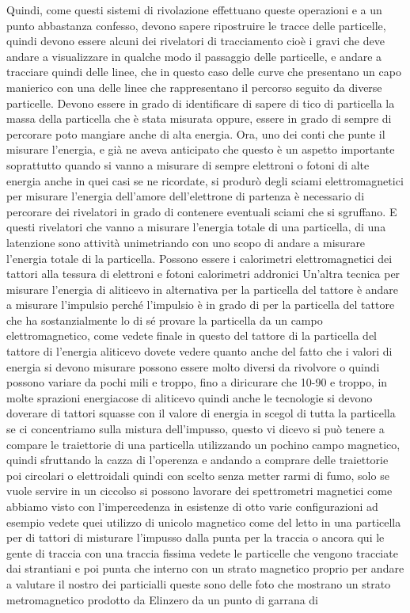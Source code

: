 {Quindi, come questi sistemi di rivolazione effettuano queste operazioni e a un punto abbastanza confesso, devono sapere ripostruire le tracce delle particelle, quindi devono essere alcuni dei rivelatori di tracciamento cioè i gravi che deve andare a visualizzare in qualche modo il passaggio delle particelle, e andare a tracciare quindi delle linee, che in questo caso delle curve che presentano un capo manierico con una delle linee che rappresentano il percorso seguito da diverse particelle. Devono essere in grado di identificare di sapere di tico di particella la massa della particella che è stata misurata oppure, essere in grado di sempre di percorare poto mangiare anche di alta energia. Ora, uno dei conti che punte il misurare l'energia, e già ne aveva anticipato che questo è un aspetto importante soprattutto quando si vanno a misurare di sempre elettroni o fotoni di alte energia anche in quei casi se ne ricordate, si produrò degli sciami elettromagnetici per misurare l'energia dell'amore dell'elettrone di partenza è necessario di percorare dei rivelatori in grado di contenere eventuali sciami che si sgruffano. E questi rivelatori che vanno a misurare l'energia totale di una particella, di una latenzione sono attività unimetriando con uno scopo di andare a misurare l'energia totale di la particella. Possono essere i calorimetri elettromagnetici dei tattori alla tessura di elettroni e fotoni calorimetri addronici Un'altra tecnica per misurare l'energia di aliticevo in alternativa per la particella del tattore è andare a misurare l'impulsio perché l'impulsio è in grado di per la particella del tattore che ha sostanzialmente lo di sé provare la particella da un campo elettromagnetico, come vedete finale in questo del tattore di la particella del tattore di l'energia aliticevo dovete vedere quanto anche del fatto che i valori di energia si devono misurare possono essere molto diversi da rivolvore o quindi possono variare da pochi mili e troppo, fino a diricurare che 10-90 e troppo, in molte sprazioni energiacose di aliticevo quindi anche le tecnologie si devono doverare di tattori squasse con il valore di energia in scegol di tutta la particella se ci concentriamo sulla mistura dell'impusso, questo vi dicevo si può tenere a compare le traiettorie di una particella utilizzando un pochino campo magnetico, quindi sfruttando la cazza di l'operenza e andando a comprare delle traiettorie poi circolari o elettroidali quindi con scelto senza metter rarmi di fumo, solo se vuole servire in un ciccolso si possono lavorare dei spettrometri magnetici come abbiamo visto con l'impercedenza in esistenze di otto varie configurazioni ad esempio vedete quei utilizzo di unicolo magnetico come del letto in una particella per di tattori di misturare l'impusso dalla punta per la traccia o ancora qui le gente di traccia con una traccia fissima vedete le particelle che vengono tracciate dai strantiani e poi punta che interno con un strato magnetico proprio per andare a valutare il nostro dei particialli queste sono delle foto che mostrano un strato metromagnetico prodotto da Elinzero da un punto di garrana di 

}
